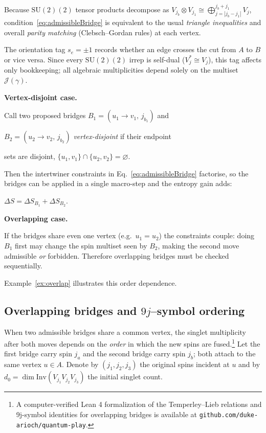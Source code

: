 \documentclass[11pt]{article}
\newcommand{\SU}{\mathrm{SU}(2)}
\newcommand{\Inv}{\mathrm{Inv}}
\newcommand{\Cut}{\gamma}
\newcommand{\JS}{\mathcal{J}} %
\begin{document}
\noindent
Because $\SU(2)$ tensor products decompose as
\(V_{j_b}\otimes V_{j_1}\cong
  \bigoplus_{j=|j_b-j_1|}^{j_b+j_1}V_{j}\),
condition~\eqref{eq:admissibleBridge} is equivalent to the usual
\emph{triangle inequalities} and overall \emph{parity matching}
(Clebsch–Gordan rules) at each vertex.

\begin{remark}\label{rem:orientationBook}
The orientation tag $s_e=\pm1$ records whether an edge crosses the cut
from $A$ to $B$ or vice versa.  Since every $\SU(2)$ irrep is self-dual
($V_j^{*}\!\cong\!V_j$), this tag affects only bookkeeping; all algebraic
multiplicities depend solely on the multiset~$\JS(\Cut)$.
\end{remark}


\begin{remark}\label{rem:simul}

\textbf{Vertex-disjoint case.}

Call two proposed bridges $B_1=(u_1\!\to\! v_1,\,j_{b_1})$ and

$B_2=(u_2\!\to\! v_2,\,j_{b_2})$ \emph{vertex-disjoint} if their endpoint

sets are disjoint, $\{u_1,v_1\}\cap\{u_2,v_2\}=\varnothing$.

Then the intertwiner constraints in Eq.~\eqref{eq:admissibleBridge} factorise,
so the bridges can be applied in a single macro-step and the entropy gain
adds:

$\Delta S=\Delta S_{B_1}+\Delta S_{B_2}$.

\textbf{Overlapping case.}

If the bridges share even one vertex (e.g.\ $u_1=u_2$) the constraints
couple: doing $B_1$ first may change the spin multiset seen by $B_2$,
making the second move admissible \emph{or} forbidden.
Therefore overlapping bridges must be checked sequentially.

Example~\ref{ex:overlap} illustrates this order dependence.

\end{remark}

\subsection{Overlapping bridges and $9j$--symbol ordering}
\label{subsec:overlap9j}

When two admissible bridges share a common vertex, the singlet
multiplicity after both moves depends on the \emph{order} in which the
new spins are fused.\footnote{A computer-verified Lean 4 formalization of the Temperley--Lieb relations and 9j-symbol identities for overlapping bridges is available at \texttt{github.com/duke-arioch/quantum-play}.}  Let the first bridge carry spin $j_a$ and the
second bridge carry spin $j_b$; both attach to the same vertex
$u\in A$.  Denote by $(j_1,j_2,j_3)$ the original spins incident at
$u$ and by $d_0=\dim\Inv(V_{j_1}V_{j_2}V_{j_3})$ the initial singlet
count.
\end{document}

